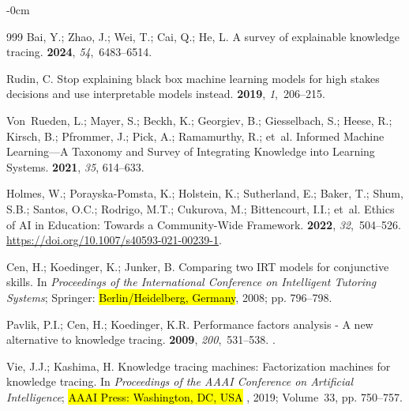 \documentclass[applsci,article,accept,moreauthors,pdftex]{Definitions/mdpi}
\begin{document}
\begin{adjustwidth}{-\extralength}{0cm}
\begin{thebibliography}{999}
Bai, Y.; Zhao, J.; Wei, T.; Cai, Q.; He, L.
\newblock A survey of explainable knowledge tracing.
 {\bf 2024}, {\em 54},~6483--6514.

Rudin, C.
\newblock Stop explaining black box machine learning models for high stakes
  decisions and use interpretable models instead.
 {\bf 2019}, {\em 1},~206--215.

Von~Rueden, L.; Mayer, S.; Beckh, K.; Georgiev, B.; Giesselbach, S.; Heese, R.;
  Kirsch, B.; Pfrommer, J.; Pick, A.; Ramamurthy, R.;  et~al.
\newblock Informed Machine Learning---A Taxonomy and Survey of Integrating
  Knowledge into Learning Systems.
 {\bf 2021}, \textit{35},
  614--633.

Holmes, W.; Porayska-Pomsta, K.; Holstein, K.; Sutherland, E.; Baker, T.; Shum,
  S.B.; Santos, O.C.; Rodrigo, M.T.; Cukurova, M.; Bittencourt, I.I.;  et~al.
\newblock Ethics of AI in Education: Towards a Community-Wide Framework.
  {\bf 2022}, {\em 32},~504–526.
\newblock 
  {\url{https://doi.org/10.1007/s40593-021-00239-1}}.

Cen, H.; Koedinger, K.; Junker, B.
\newblock Comparing two IRT models for conjunctive skills.
\newblock In \textit{Proceedings of the International Conference on Intelligent
  Tutoring Systems}; Springer: \hl{Berlin/Heidelberg, Germany}, %
 2008; pp. 796--798.

Pavlik, P.I.; Cen, H.; Koedinger, K.R.
\newblock Performance factors analysis - A new alternative to knowledge
  tracing.
 {\bf
  2009}, {\em 200},~531–538.
.

Vie, J.J.; Kashima, H.
\newblock Knowledge tracing machines: Factorization machines for knowledge
  tracing.
\newblock In \textit{Proceedings of the AAAI Conference on
  Artificial Intelligence}; \hl{AAAI Press: Washington, DC, USA}%
, 2019; Volume~33, pp. 750--757.


\end{thebibliography}
\end{adjustwidth}
\end{document}
